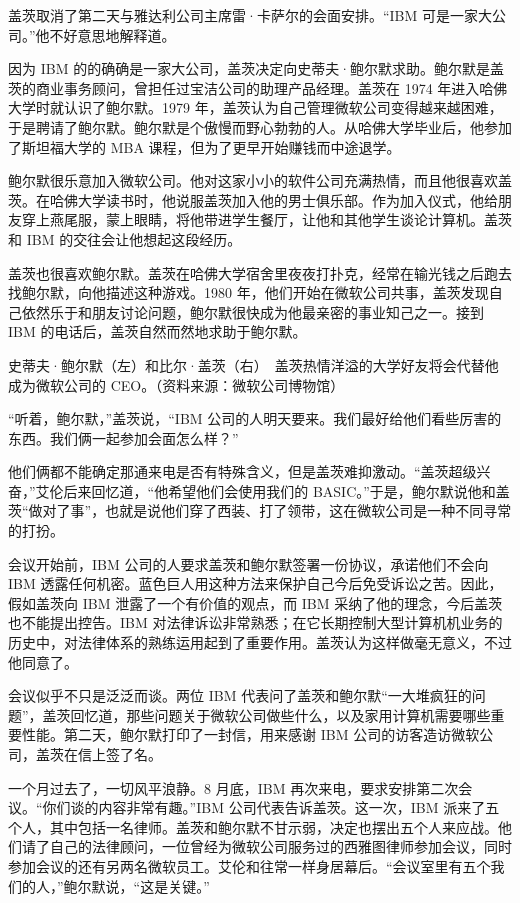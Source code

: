 \documentclass[12pt,UTF8]{ctexbook}
\begin{document}
盖茨取消了第二天与雅达利公司主席雷·卡萨尔的会面安排。“IBM 可是一家大公司。”他不好意思地解释道。

因为 IBM 的的确确是一家大公司，盖茨决定向史蒂夫·鲍尔默求助。鲍尔默是盖茨的商业事务顾问，曾担任过宝洁公司的助理产品经理。盖茨在 1974 年进入哈佛大学时就认识了鲍尔默。1979 年，盖茨认为自己管理微软公司变得越来越困难，于是聘请了鲍尔默。鲍尔默是个傲慢而野心勃勃的人。从哈佛大学毕业后，他参加了斯坦福大学的 MBA 课程，但为了更早开始赚钱而中途退学。

鲍尔默很乐意加入微软公司。他对这家小小的软件公司充满热情，而且他很喜欢盖茨。在哈佛大学读书时，他说服盖茨加入他的男士俱乐部。作为加入仪式，他给朋友穿上燕尾服，蒙上眼睛，将他带进学生餐厅，让他和其他学生谈论计算机。盖茨和 IBM 的交往会让他想起这段经历。

盖茨也很喜欢鲍尔默。盖茨在哈佛大学宿舍里夜夜打扑克，经常在输光钱之后跑去找鲍尔默，向他描述这种游戏。1980 年，他们开始在微软公司共事，盖茨发现自己依然乐于和朋友讨论问题，鲍尔默很快成为他最亲密的事业知己之一。接到 IBM 的电话后，盖茨自然而然地求助于鲍尔默。



史蒂夫·鲍尔默（左）和比尔·盖茨（右）　盖茨热情洋溢的大学好友将会代替他成为微软公司的 CEO。（资料来源：微软公司博物馆）

“听着，鲍尔默，”盖茨说，“IBM 公司的人明天要来。我们最好给他们看些厉害的东西。我们俩一起参加会面怎么样？”

他们俩都不能确定那通来电是否有特殊含义，但是盖茨难抑激动。“盖茨超级兴奋，”艾伦后来回忆道，“他希望他们会使用我们的 BASIC。”于是，鲍尔默说他和盖茨“做对了事”，也就是说他们穿了西装、打了领带，这在微软公司是一种不同寻常的打扮。

会议开始前，IBM 公司的人要求盖茨和鲍尔默签署一份协议，承诺他们不会向 IBM 透露任何机密。蓝色巨人用这种方法来保护自己今后免受诉讼之苦。因此，假如盖茨向 IBM 泄露了一个有价值的观点，而 IBM 采纳了他的理念，今后盖茨也不能提出控告。IBM 对法律诉讼非常熟悉；在它长期控制大型计算机机业务的历史中，对法律体系的熟练运用起到了重要作用。盖茨认为这样做毫无意义，不过他同意了。

会议似乎不只是泛泛而谈。两位 IBM 代表问了盖茨和鲍尔默“一大堆疯狂的问题”，盖茨回忆道，那些问题关于微软公司做些什么，以及家用计算机需要哪些重要性能。第二天，鲍尔默打印了一封信，用来感谢 IBM 公司的访客造访微软公司，盖茨在信上签了名。

一个月过去了，一切风平浪静。8 月底，IBM 再次来电，要求安排第二次会议。“你们谈的内容非常有趣。”IBM 公司代表告诉盖茨。这一次，IBM 派来了五个人，其中包括一名律师。盖茨和鲍尔默不甘示弱，决定也摆出五个人来应战。他们请了自己的法律顾问，一位曾经为微软公司服务过的西雅图律师参加会议，同时参加会议的还有另两名微软员工。艾伦和往常一样身居幕后。“会议室里有五个我们的人，”鲍尔默说，“这是关键。”
\end{document}

